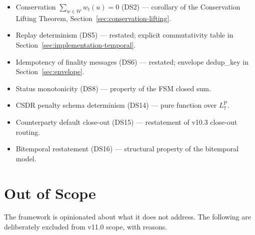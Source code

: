 \documentclass[11pt,a4paper]{article}
\begin{document}
\begin{itemize}[nosep]
\item Conservation $\sum_{w \in \mathcal{W}} w_t(u) = 0$ (DS2) --- corollary of the Conservation Lifting Theorem, Section~\ref{sec:conservation-lifting}.
\item Replay determinism (DS5) --- restated; explicit commutativity table in Section~\ref{sec:implementation-temporal}.
\item Idempotency of finality messages (DS6) --- restated; envelope dedup\_key in Section~\ref{sec:envelope}.
\item Status monotonicity (DS8) --- property of the FSM closed sum.
\item CSDR penalty schema determinism (DS14) --- pure function over $L_7^{\mathrm{P}}$.
\item Counterparty default close-out (DS15) --- restatement of v10.3 close-out routing.
\item Bitemporal restatement (DS16) --- structural property of the bitemporal model.
\end{itemize}

\clearpage
\section{Out of Scope}
\label{sec:out-of-scope}

The framework is opinionated about what it does not address. The following are deliberately excluded from v11.0 scope, with reasons.
\end{document}
